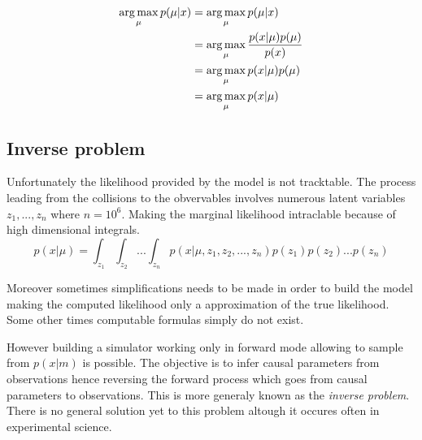 \begin{align}
	\operatorname*{arg\,max}_\mu p(\mu | x) &= \operatorname*{arg\,max}_\mu p(\mu | x) \\
							&= \operatorname*{arg\,max}_\mu \frac{p(x|\mu) p(\mu)}{p(x)} \\
							&= \operatorname*{arg\,max}_\mu p(x|\mu) p(\mu) \\
							&= \operatorname*{arg\,max}_\mu p(x|\mu)\\
\end{align}







\subsection{Inverse problem} %
\label{sub:inverse_problem}


Unfortunately the likelihood provided by the model is not tracktable.
The process leading from the collisions to the obvervables involves numerous latent variables $z_1, ..., z_n$ where $n=10^6$.
Making the marginal likelihood intraclable because of high dimensional integrals.
\begin{equation}
	\label{eq:intractable_integral}
	p(x|\mu) = \int_{z_1} \int_{z_2} ... \int_{z_n} p(x|\mu, z_1, z_2, ..., z_n) p(z_1) p(z_2) ... p(z_n)
\end{equation}


Moreover sometimes simplifications needs to be made in order to build the model \needcite making the computed likelihood only a approximation of the true likelihood.
Some other times computable formulas simply do not exist.



However building a simulator working only in forward mode allowing to sample from $p(x|m)$ is possible.
The objective is to infer causal parameters from observations hence reversing the forward process which goes from causal parameters to observations.
This is more generaly known as the \emph{inverse problem}.
There is no general solution yet to this problem altough it occures often in experimental science.


